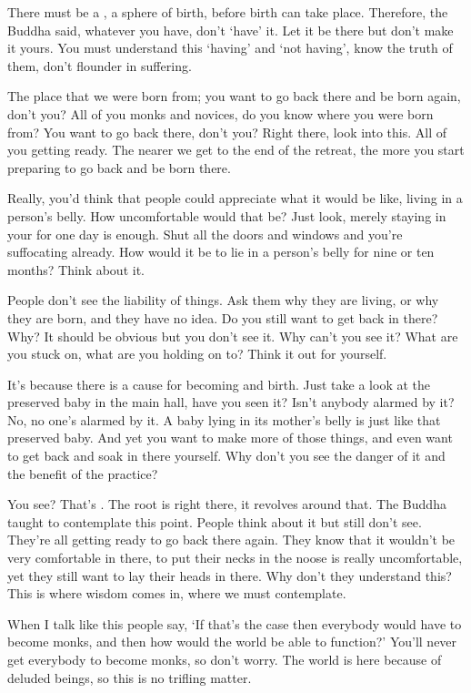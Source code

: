 There must be a , a sphere of birth, before birth can take place. Therefore, the Buddha said, whatever you have, don't `have' it. Let it be there but don't make it yours. You must understand this `having' and `not having', know the truth of them, don't flounder in suffering.

The place that we were born from; you want to go back there and be born again, don't you? All of you monks and novices, do you know where you were born from? You want to go back there, don't you? Right there, look into this. All of you getting ready. The nearer we get to the end of the retreat, the more you start preparing to go back and be born there.

Really, you'd think that people could appreciate what it would be like, living in a person's belly. How uncomfortable would that be? Just look, merely staying in your  for one day is enough. Shut all the doors and windows and you're suffocating already. How would it be to lie in a person's belly for nine or ten months? Think about it.

People don't see the liability of things. Ask them why they are living, or why they are born, and they have no idea. Do you still want to get back in there? Why? It should be obvious but you don't see it. Why can't you see it? What are you stuck on, what are you holding on to? Think it out for yourself.

It's because there is a cause for becoming and birth. Just take a look at the preserved baby in the main hall, have you seen it? Isn't anybody alarmed by it? No, no one's alarmed by it. A baby lying in its mother's belly is just like that preserved baby. And yet you want to make more of those things, and even want to get back and soak in there yourself. Why don't you see the danger of it and the benefit of the practice?

You see? That's . The root is right there, it revolves around that. The Buddha taught to contemplate this point. People think about it but still don't see. They're all getting ready to go back there again. They know that it wouldn't be very comfortable in there, to put their necks in the noose is really uncomfortable, yet they still want to lay their heads in there. Why don't they understand this? This is where wisdom comes in, where we must contemplate.

When I talk like this people say, `If that's the case then everybody would have to become monks, and then how would the world be able to function?' You'll never get everybody to become monks, so don't worry. The world is here because of deluded beings, so this is no trifling matter.

